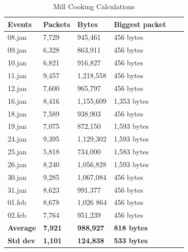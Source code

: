 \begin{table}[!ht]
    \centering
    \caption{Mill Cooking Calculations}
    \begin{tabular}{|l|l|l|l|l|l|}
    \hline
        \textbf{Events} & \textbf{Packets} & \textbf{Bytes} & \textbf{Biggest packet} \\ \hline
        08.jan & 7,729 & 945,461 & 456 bytes \\ \hline
        09.jan & 6,328 & 863,911 & 456 bytes \\ \hline
        10.jan & 6,821 & 916,827 & 456 bytes \\ \hline
        11.jan & 9,457 & 1,218,558 & 456 bytes \\ \hline
        12.jan & 7,600 & 965,797 & 456 bytes \\ \hline
        16.jan & 8,416 & 1,155,609 & 1,353 bytes \\ \hline
        18.jan & 7,589 & 938,903 & 456 bytes \\ \hline
        19.jan & 7,075 & 872,150 & 1,593 bytes \\ \hline
        24.jan & 9,395 & 1,129,302 & 1,593 bytes \\ \hline
        25.jan & 5,818 & 734,000 & 1,583 bytes \\ \hline
        26.jan & 8,240 & 1,056,828 & 1,593 bytes \\ \hline
        30.jan & 9,285 & 1,067,084 & 456 bytes  \\ \hline
        31.jan & 8,623 & 991,377 & 456 bytes \\ \hline
        01.feb & 8,678 & 1,026 864 & 456 bytes \\ \hline
        02.feb & 7,764 & 951,239 & 456 bytes \\ \hline
        \textbf{Average} & \textbf{7,921} & \textbf{988,927} & \textbf{818 bytes} \\ \hline
        \textbf{Std dev} & \textbf{1,101} & \textbf{124,838} & \textbf{533 bytes} \\ \hline
    \end{tabular}
    \label{tab:MillCookingCalculations}
\end{table}


